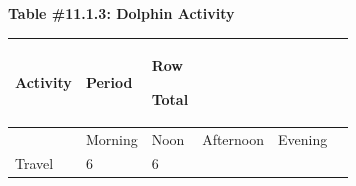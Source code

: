 \documentclass[]{book}
\begin{document}
\textbf{Table \#11.1.3: Dolphin Activity}

\begin{longtable}[]{@{}llllll@{}}
\toprule
\begin{minipage}[b]{0.17\columnwidth}\raggedright
Activity\strut
\end{minipage} & \begin{minipage}[b]{0.12\columnwidth}\raggedright
Period\strut
\end{minipage} & \begin{minipage}[b]{0.09\columnwidth}\raggedright
Row

Total\strut
\end{minipage} & \begin{minipage}[b]{0.14\columnwidth}\raggedright
\strut
\end{minipage} & \begin{minipage}[b]{0.12\columnwidth}\raggedright
\strut
\end{minipage} & \begin{minipage}[b]{0.07\columnwidth}\raggedright
\strut
\end{minipage}\tabularnewline
\midrule
\endhead
\begin{minipage}[t]{0.17\columnwidth}\raggedright
\strut
\end{minipage} & \begin{minipage}[t]{0.12\columnwidth}\raggedright
Morning\strut
\end{minipage} & \begin{minipage}[t]{0.09\columnwidth}\raggedright
Noon\strut
\end{minipage} & \begin{minipage}[t]{0.14\columnwidth}\raggedright
Afternoon\strut
\end{minipage} & \begin{minipage}[t]{0.12\columnwidth}\raggedright
Evening\strut
\end{minipage} & \begin{minipage}[t]{0.07\columnwidth}\raggedright
\strut
\end{minipage}\tabularnewline
\begin{minipage}[t]{0.17\columnwidth}\raggedright
Travel\strut
\end{minipage} & \begin{minipage}[t]{0.12\columnwidth}\raggedright
6\strut
\end{minipage} & \begin{minipage}[t]{0.09\columnwidth}\raggedright
6\strut
\end{minipage} & \begin{minipage}[t]{0.14\columnwidth}\raggedright

\end{minipage}
\end{longtable}
\end{document}

